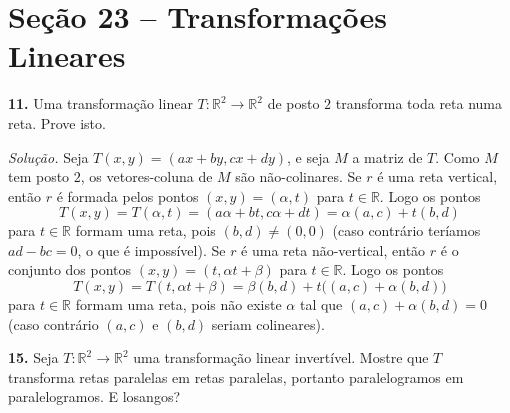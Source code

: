 \documentclass[a4paper,11pt]{article}
\newcommand{\R}{\mathbb{R}}
\begin{document}
\section*{Seção 23 -- Transformações Lineares}

\textbf{11.}
Uma transformação linear $T : \R^2 \to \R^2$ de posto $2$ transforma toda reta numa reta.
Prove isto.

\vspace{\baselineskip}

\emph{Solução.}
Seja $T(x,y) = (ax + by, cx + dy)$, e seja $M$ a matriz de $T$.
Como $M$ tem posto $2$, os vetores-coluna de $M$ são não-colinares.
Se $r$ é uma reta vertical, então $r$ é formada pelos pontos $(x,y) = (\alpha,t)$ para $t \in \R$.
Logo os pontos
\[
  T(x,y) = T(\alpha, t) = (a \alpha + bt, c \alpha + dt) = \alpha(a, c) + t(b,d)
\]
para $t \in \R$ formam uma reta, pois $(b,d) \neq (0,0)$ (caso contrário teríamos $ad - bc = 0$, o que é impossível).
Se $r$ é uma reta não-vertical, então $r$ é o conjunto dos pontos $(x,y) = (t, \alpha t + \beta)$ para $t \in \R$.
Logo os pontos
\[
  T(x,y) = T(t, \alpha t + \beta) = \beta(b,d) + t \big( (a,c) + \alpha (b,d) \big)
\]
para $t \in \R$ formam uma reta, pois não existe $\alpha$ tal que $(a,c) + \alpha(b,d) = 0$ (caso contrário $(a,c)$ e $(b,d)$ seriam colineares).

\vspace{\baselineskip}

\textbf{15.}
Seja $T : \R^2 \to \R^2$ uma transformação linear invertível.
Mostre que $T$ transforma retas paralelas em retas paralelas, portanto paralelogramos em paralelogramos.
E losangos?

\vspace{\baselineskip}
\end{document}
